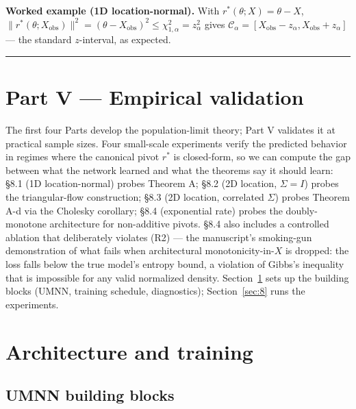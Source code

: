 \documentclass[11pt]{article}
\begin{document}
\textbf{Worked example (1D location-normal).} With
\(r^*(\theta; X) = \theta - X\),
\(\|r^*(\theta; X_\mathrm{obs})\|^2 = (\theta - X_\mathrm{obs})^2 \le \chi^2_{1, \alpha} = z_\alpha^2\)
gives
\(\mathcal{C}_\alpha = [X_\mathrm{obs} - z_\alpha, X_\mathrm{obs} + z_\alpha]\)
--- the standard \(z\)-interval, as expected.

\medskip\hrule\medskip

\section*{Part V — Empirical validation}

The first four Parts develop the population-limit theory; Part V
validates it at practical sample sizes. Four small-scale experiments
verify the predicted behavior in regimes where the canonical pivot
\(r^*\) is closed-form, so we can compute the gap between what the
network learned and what the theorems say it should learn: §8.1
(1D location-normal) probes Theorem A; §8.2 (2D location, \(\Sigma = I\))
probes the triangular-flow construction; §8.3 (2D location, correlated
\(\Sigma\)) probes Theorem A-d via the Cholesky corollary; §8.4
(exponential rate) probes the doubly-monotone architecture for
non-additive pivots. §8.4 also includes a controlled ablation that
deliberately violates (R2) --- the manuscript's smoking-gun
demonstration of what fails when architectural monotonicity-in-\(X\)
is dropped: the loss falls below the true model's entropy bound, a
violation of Gibbs's inequality that is impossible for any valid
normalized density. Section~\ref{sec:7} sets up the building blocks
(UMNN, training schedule, diagnostics); Section~\ref{sec:8} runs the
experiments.

\section{Architecture and training}\label{sec:7}

\subsection{UMNN building blocks}\label{subsec:7.1}
\end{document}

